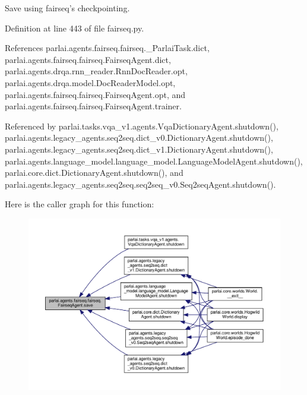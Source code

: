 \begin{DoxyVerb}Save using fairseq's checkpointing.\end{DoxyVerb}
 

Definition at line 443 of file fairseq.\+py.



References parlai.\+agents.\+fairseq.\+fairseq.\+\_\+\+Parlai\+Task.\+dict, parlai.\+agents.\+fairseq.\+fairseq.\+Fairseq\+Agent.\+dict, parlai.\+agents.\+drqa.\+rnn\+\_\+reader.\+Rnn\+Doc\+Reader.\+opt, parlai.\+agents.\+drqa.\+model.\+Doc\+Reader\+Model.\+opt, parlai.\+agents.\+fairseq.\+fairseq.\+Fairseq\+Agent.\+opt, and parlai.\+agents.\+fairseq.\+fairseq.\+Fairseq\+Agent.\+trainer.



Referenced by parlai.\+tasks.\+vqa\+\_\+v1.\+agents.\+Vqa\+Dictionary\+Agent.\+shutdown(), parlai.\+agents.\+legacy\+\_\+agents.\+seq2seq.\+dict\+\_\+v0.\+Dictionary\+Agent.\+shutdown(), parlai.\+agents.\+legacy\+\_\+agents.\+seq2seq.\+dict\+\_\+v1.\+Dictionary\+Agent.\+shutdown(), parlai.\+agents.\+language\+\_\+model.\+language\+\_\+model.\+Language\+Model\+Agent.\+shutdown(), parlai.\+core.\+dict.\+Dictionary\+Agent.\+shutdown(), and parlai.\+agents.\+legacy\+\_\+agents.\+seq2seq.\+seq2seq\+\_\+v0.\+Seq2seq\+Agent.\+shutdown().

Here is the caller graph for this function\+:
\nopagebreak
\begin{figure}[H]
\begin{center}
\leavevmode
\includegraphics[width=350pt]{classparlai_1_1agents_1_1fairseq_1_1fairseq_1_1FairseqAgent_ad4804131388a6f88f01fc124e7692069_icgraph}
\end{center}
\end{figure}
\mbox{\label{classparlai_1_1agents_1_1fairseq_1_1fairseq_1_1FairseqAgent_abf0abba72dd186a1a3773a04f7cde12d}} 
